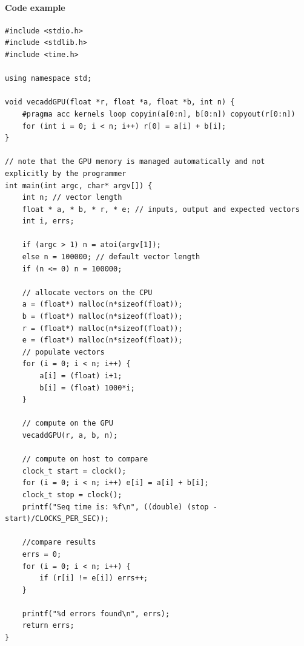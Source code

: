 \documentclass[10pt]{report}
\begin{document}
\paragraph{Code example}
\begin{lstlisting}[style=myC]
#include <stdio.h>
#include <stdlib.h>
#include <time.h>

using namespace std;

void vecaddGPU(float *r, float *a, float *b, int n) {
	#pragma acc kernels loop copyin(a[0:n], b[0:n]) copyout(r[0:n])
	for (int i = 0; i < n; i++) r[0] = a[i] + b[i];
}

// note that the GPU memory is managed automatically and not explicitly by the programmer
int main(int argc, char* argv[]) {
	int n; // vector length
	float * a, * b, * r, * e; // inputs, output and expected vectors
	int i, errs;

	if (argc > 1) n = atoi(argv[1]);
	else n = 100000; // default vector length
	if (n <= 0) n = 100000;

	// allocate vectors on the CPU
	a = (float*) malloc(n*sizeof(float));
	b = (float*) malloc(n*sizeof(float));
	r = (float*) malloc(n*sizeof(float));
	e = (float*) malloc(n*sizeof(float));
	// populate vectors
	for (i = 0; i < n; i++) {
		a[i] = (float) i+1;
		b[i] = (float) 1000*i;
	}

	// compute on the GPU
	vecaddGPU(r, a, b, n);

	// compute on host to compare
	clock_t start = clock();
	for (i = 0; i < n; i++) e[i] = a[i] + b[i];
	clock_t stop = clock();
	printf("Seq time is: %f\n", ((double) (stop - start)/CLOCKS_PER_SEC));

	//compare results
	errs = 0;
	for (i = 0; i < n; i++) {
		if (r[i] != e[i]) errs++;
	}

	printf("%d errors found\n", errs);
	return errs;
}
\end{lstlisting}
\pagebreak
\end{document}
